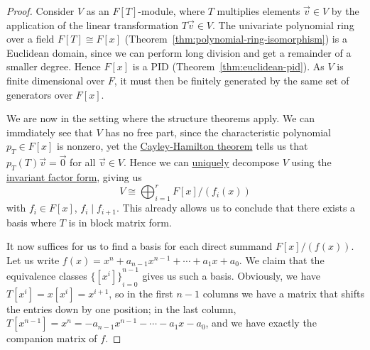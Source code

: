 \begin{proof}
    Consider \(V\) as an \(F[T]\)-module,
    where \(T\) multiplies elements \(\vec{v} \in V\)
    by the application of the linear transformation \(T\vec{v} \in V\).
    The univariate polynomial ring over a field \(F[T] \cong F[x]\)
    (Theorem~\ref{thm:polynomial-ring-isomorphism})
    is a Euclidean domain,
    since we can perform long division and get a remainder of a smaller degree.
    Hence \(F[x]\) is a PID (Theorem~\ref{thm:euclidean-pid}).
    As \(V\) is finite dimensional over \(F\),
    it must then be finitely generated by the same set of generators over \(F[x]\).
    
    We are now in the setting where the structure theorems apply.
    We can immdiately see that \(V\) has no free part,
    since the characteristic polynomial \(p_T \in F[x]\) is nonzero,
    yet the \hyperref[lem:cayley-hamilton]{Cayley-Hamilton theorem}
    tells us that \(p_T(T)\vec{v} = \vec{0}\) for all \(\vec{v} \in V\).
    Hence we can \hyperref[thm:structure-uniqueness]{uniquely} decompose \(V\)
    using the \hyperref[thm:structure-invariant]{invariant factor form},
    giving us
    \begin{equation*}
        V \cong \bigoplus_{i=1}^r F[x]/(f_i(x))
    \end{equation*}
    with \(f_i \in F[x]\), \(f_i \mid f_{i+1}\).
    This already allows us to conclude that there exists a basis
    where \(T\) is in block matrix form.
    
    It now suffices for us to find a basis for each direct summand \(F[x]/(f(x))\).
    Let us write \(f(x) = x^n + a_{n-1}x^{n-1} + \cdots + a_1x + a_0\).
    We claim that the equivalence classes \({\{[x^i]\}}_{i=0}^{n-1}\) gives us such a basis.
    Obviously, we have \(T[x^i] = x[x^i] = x^{i+1}\),
    so in the first \(n-1\) columns we have a matrix that shifts the entries down by one position;
    in the last column, \(T[x^{n-1}] = x^n = -a_{n-1}x^{n-1} - \cdots - a_1x - a_0\),
    and we have exactly the companion matrix of \(f\).
\end{proof}


